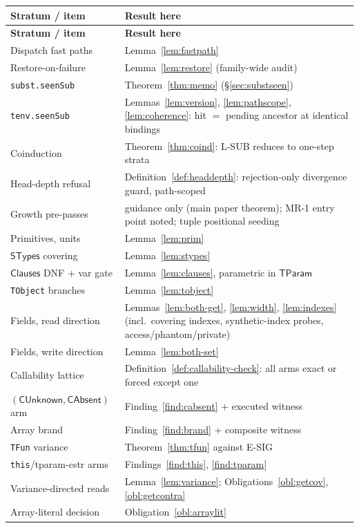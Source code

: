 \documentclass[11pt]{article}
\newcommand{\STypes}{\mathsf{STypes}}
\newcommand{\Clauses}{\mathsf{Clauses}}
\newcommand{\TParam}{\mathsf{TParam}}
\begin{document}
\begingroup
\renewcommand{\arraystretch}{1.25}
\small
\begin{longtable}{@{}p{2.9cm}p{10.5cm}@{}}
\toprule
\textbf{Stratum / item} & \textbf{Result here} \\
\midrule
\endfirsthead
\toprule
\textbf{Stratum / item} & \textbf{Result here} \\
\midrule
\endhead
\bottomrule
\endlastfoot
Dispatch fast paths & Lemma~\ref{lem:fastpath} \\
Restore-on-failure & Lemma~\ref{lem:restore} (family-wide audit) \\
\texttt{subst.seenSub} & Theorem~\ref{thm:memo} (\S\ref{sec:substseen}) \\
\texttt{tenv.seenSub} & Lemmas~\ref{lem:version},
  \ref{lem:pathscope}, \ref{lem:coherence}: hit $=$ pending ancestor at
  identical bindings \\
Coinduction & Theorem~\ref{thm:coind}: L-SUB reduces to one-step strata \\
Head-depth refusal & Definition~\ref{def:headdepth}: rejection-only
  divergence guard, path-scoped \\
Growth pre-passes & guidance only (main paper theorem);
  MR-1 entry point noted; tuple positional seeding \\
Primitives, units & Lemma~\ref{lem:prim} \\
$\STypes$ covering & Lemma~\ref{lem:stypes} \\
$\Clauses$ DNF + var gate & Lemma~\ref{lem:clauses}, parametric in
  $\TParam$ \\
\texttt{TObject} branches & Lemma~\ref{lem:tobject} \\
Fields, read direction & Lemmas~\ref{lem:both-get}, \ref{lem:width},
  \ref{lem:indexes} (incl.\ covering indexes, synthetic-index probes,
  access/phantom/private) \\
Fields, write direction & Lemma~\ref{lem:both-set} \\
Callability lattice & Definition~\ref{def:callability-check}: all arms
  exact or forced except one \\
$(\mathsf{CUnknown},\mathsf{CAbsent})$ arm & Finding~\ref{find:cabsent}
  + executed witness \\
Array brand & Finding~\ref{find:brand} + composite witness \\
\texttt{TFun} variance & Theorem~\ref{thm:tfun} against E-SIG \\
\texttt{this}/tparam-cstr arms & Findings~\ref{find:this},
  \ref{find:tparam} \\
Variance-directed reads & Lemma~\ref{lem:variance};
  Obligations~\ref{obl:getcov}, \ref{obl:getcontra} \\
Array-literal decision & Obligation~\ref{obl:arraylit} \\
\end{longtable}
\endgroup
\end{document}
